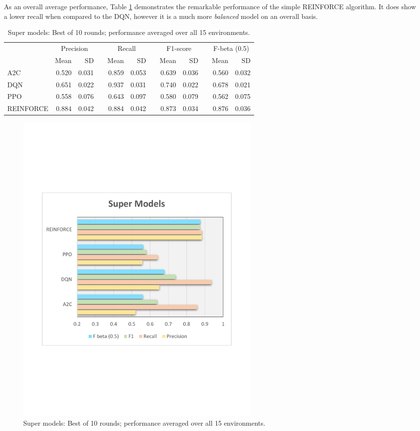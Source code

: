 \documentclass[a4paper, 12pt]{article}
\newcommand{\rowspace}[1]{\renewcommand{\arraystretch}{#1}}
\begin{document}
As an overall average performance, Table \ref{tbl:supermodelssummary} demonstrates the remarkable performance of the simple REINFORCE algorithm. It does show a lower recall when compared to the DQN, however it is a much more \textit{balanced} model on an overall basis.
\begin{table}[h]\centering
	\sffamily
	\rowspace{1.3}
	\begin{tabular}{@{}l rr c rr c rr c rr@{}}
		\arrayrulecolor{black!40}\toprule
		& \multicolumn{2}{c}{Precision} & \phantom{i} & \multicolumn{2}{c}{Recall} & \phantom{i} & \multicolumn{2}{c}{F1-score} & \phantom{i} & \multicolumn{2}{c}{F-beta (0.5)} \\
		\cmidrule{2-3} \cmidrule{5-6} \cmidrule{8-9} \cmidrule{11-12} 
		
		&Mean &SD & &Mean &SD & &Mean &SD& &Mean & SD\\ \midrule
		A2C & 0.520 & 0.031 & &0.859 & 0.053 & & 0.639 & 0.036 & &0.560 &0.032 \\
		DQN & 0.651 & 0.022 & &0.937 & 0.031 & & 0.740 & 0.022 & &0.678 &0.021 \\
		PPO & 0.558 & 0.076 & &0.643 & 0.097 & & 0.580 & 0.079 & &0.562 &0.075 \\
		REINFORCE & 0.884 & 0.042 & &0.884 & 0.042 & & 0.873 & 0.034 & &0.876 &0.036 \\
		\bottomrule
	\end{tabular}
	\caption{Super models: Best of 10 rounds; performance averaged over all 15 environments.}
	\label{tbl:supermodelssummary}
\end{table}
\begin{figure}[!htbp]
	\centering
	\includegraphics[width=0.6\textwidth, trim={1.5cm 7cm 1cm 7cm}]{images/SuperModelsPlot.pdf}  
	\caption{Super models: Best of 10 rounds; performance averaged over all 15 environments.}
	\label{fig:supermodels}
\end{figure}
\end{document}
